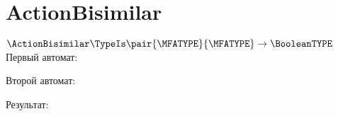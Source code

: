 \section{ActionBisimilar}
\begin{frame}{$\ActionBisimilar\TypeIs\pair{\MFATYPE}{\MFATYPE}\to\BooleanTYPE$}
	Первый автомат:

	Второй автомат:

	Результат:

\end{frame}